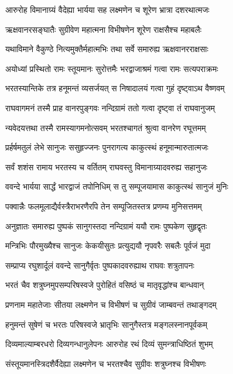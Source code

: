 \twolineshloka
{आरुरोह विमानाग्र्यं वैदेह्या भार्यया सह}
{लक्ष्मणेन च शूरेण भ्रात्रा दशरथात्मजः}%

\twolineshloka
{ऋक्षवानरसङ्घातैः सुग्रीवेण महात्मना}
{विभीषणेन शूरेण राक्षसैश्च महाबलैः}%

\twolineshloka
{यथाविमाने वैकुण्ठे नित्यमुक्तैर्महात्मभिः}
{तथा सर्वे समारुह्य ऋक्षवानरराक्षसाः}%

\twolineshloka
{अयोध्यां प्रस्थितो रामः स्तूयमानः सुरोत्तमैः}
{भरद्वाजाश्रमं गत्वा रामः सत्यपराक्रमः}%

\twolineshloka
{भरतस्यान्तिके तत्र हनूमन्तं व्यसर्जयत्}
{स निषादालयं गत्वा गुहं दृष्ट्वाऽथ वैष्णवम्}%

\twolineshloka
{राघवागमनं तस्मै प्राह वानरपुङ्गवः}
{नन्दिग्रामं ततो गत्वा दृष्ट्वा तं राघवानुजम्}%

\twolineshloka
{न्यवेदयत्तथा तस्मै रामस्यागमनोत्सवम्}
{भरतश्चागतं श्रुत्वा वानरेण रघूत्तमम्}%

\twolineshloka
{प्रर्हर्षमतुलं लेभे सानुजः ससुहृज्जनः}
{पुनरागत्य काकुत्स्थं हनूमान्मारुतात्मजः}%

\twolineshloka
{सर्वं शशंस रामाय भरतस्य च वर्तितम्}
{राघवस्तु विमानाग्र्यादवरुह्य सहानुजः}%

\twolineshloka
{ववन्दे भार्यया सार्द्धं भारद्वाजं तपोनिधिम्}
{स तु सम्पूजयामास काकुत्स्थं सानुजं मुनिः}%

\twolineshloka
{पक्वान्नैः फलमूलाद्यैर्वस्त्रैराभरणैरपि}
{तेन सम्पूजितस्तत्र प्रणम्य मुनिसत्तमम्}%

\twolineshloka
{अनुज्ञातः समारुह्य पुष्पकं सानुगस्तदा}
{नन्दिग्रामं ययौ रामः पुष्पकेण सुहृद्वृतः}%

\twolineshloka
{मन्त्रिभिः पौरमुख्यैश्च सानुजः केकयीसुतः}
{प्रत्युद्ययौ नृपवरैः सबलैः पूर्वजं मुदा}%

\twolineshloka
{सम्प्राप्य रघुशार्दूलं ववन्दे सानुगैर्वृतः}
{पुष्पकादवरुह्याथ राघवः शत्रुतापनः}%

\twolineshloka
{भरतं चैव शत्रुघ्नमुपसम्परिषस्वजे}
{पुरोहितं वसिष्ठं च मातृवृद्धांश्च बान्धवान्}%

\twolineshloka
{प्रणनाम महातेजाः सीतया लक्ष्मणेन च}
{विभीषणं च सुग्रीवं जाम्बवन्तं तथाङ्गदम्}%

\twolineshloka
{हनुमन्तं सुषेणं च भरतः परिषस्वजे}
{भ्रातृभिः सानुगैस्तत्र मङ्गलस्नानपूर्वकम्}%

\twolineshloka
{दिव्यमाल्याम्बरधरो दिव्यगन्धानुलेपनः}
{आरुरोह रथं दिव्यं सुमन्त्राधिष्ठितं शुभम्}%

\twolineshloka
{संस्तूयमानस्त्रिदशैर्वैदेह्या लक्ष्मणेन च}
{भरतश्चैव सुग्रीवः शत्रुघ्नश्च विभीषणः}%

